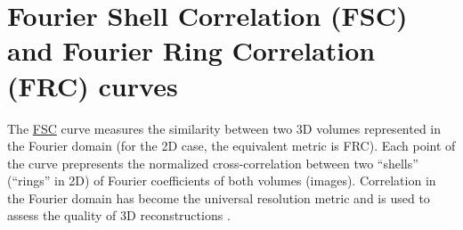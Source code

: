 \begin{comment}
This requirement often presents a significant
challenge, particularly in contexts where samples are susceptible to
the degradation caused by the microscope radiation, thereby limiting
the feasibility of acquiring multiple such instances.

When this is not possible, one way to simulate having two or more
noisy instances of the same clean signal is to distribute the
pixels/voxels across two or more images/volumes (see Appendices
\ref{sec:EOS}, \ref{sec:CBS}, \ref{sec:ICBS}, \ref{sec:SCBS}, and
\ref{sec:SPRS}). Unfortunately, the splitting reduces the spatial
resolution at which the signal/noise parameters can be successfully
estudied.
\end{comment}


\section{Fourier Shell Correlation (FSC) and Fourier Ring
  Correlation (FRC) curves}
\label{sec:fourier_correlation}

The
\href{https://en.wikipedia.org/wiki/Fourier_shell_correlation}{\gls{FSC}}
curve measures the similarity between two 3D volumes represented in
the Fourier domain \cite{verbeke2024self} (for the 2D case, the
equivalent metric is \gls{FRC}). Each point of the curve prepresents
the normalized cross-correlation between two ``shells'' (``rings'' in
2D) of Fourier coefficients of both volumes (images). Correlation in
the Fourier domain has become the universal resolution metric and is
used to assess the quality of 3D reconstructions
\cite{rosenthal2003optimal,scheres2012prevention}.

\begin{comment}
An advantage of correlation in the Fourier domain (FC\footnote{When
  the number of dimensions is not relevant, we will refer to this
  metric simply by FC (Fourier Correlation).}) over other similarity
metrics such as RMSE, SSIM or PPC is that FC values depend on the
frequency, and this can be interesting in some scenarios, such as
microscopy, where the resolution of the microscope is finite and known
a priori \cite{nieuwenhuizen2013measuring}. Notice that, with this
information, we can know whether the denoising is removing the
high-frequency components of the clean signal, or on the contrary,
basically noise.\footnote{When the SNR is very low, the Fourier
  coefficients of the same ring/shell of two different noisy versions
  of the same signal are uncorrelated and therefore, the corresponding
  curves values should be close to zero.}  For this reason, in some
fields such as single particle electron cryo-microscopy (cryo-EM),
\end{comment}

